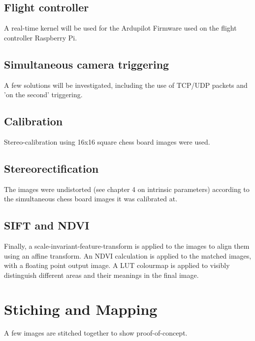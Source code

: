 \subsection{Flight controller}

A real-time kernel will be used for the Ardupilot Firmware used on the flight controller Raspberry Pi.

\subsection{Simultaneous camera triggering}

A few solutions will be investigated, including the use of TCP/UDP packets and 'on the second' triggering.

\subsection{Calibration}

Stereo-calibration using 16x16 square chess board images were used.

\subsection{Stereorectification}

The images were undistorted (see chapter 4 on intrinsic parameters) according to the simultaneous chess board images it was calibrated at.

\subsection{SIFT and NDVI}

Finally, a scale-invariant-feature-transform is applied to the images to align them using an affine transform. An NDVI calculation is applied to the matched images, with a floating point output image. A LUT colourmap is applied to visibly distinguish different areas and their meanings in the final image.

\section{Stiching and Mapping}

A few images are stitched together to show proof-of-concept.